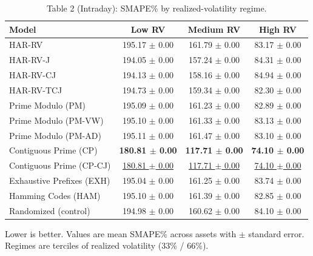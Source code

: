 \begin{table}[t]
\centering
\caption{Table 2 (Intraday): SMAPE\% by realized-volatility regime.}
\label{tab:regimes_intraday}
\begin{tabular}{lccc}
\toprule
Model & Low RV & Medium RV & High RV \\
\midrule
 HAR-RV & 195.17 $\pm$ 0.00 & 161.79 $\pm$ 0.00 & 83.17 $\pm$ 0.00 \\
 HAR-RV-J & 194.05 $\pm$ 0.00 & 157.24 $\pm$ 0.00 & 84.31 $\pm$ 0.00 \\
 HAR-RV-CJ & 194.13 $\pm$ 0.00 & 158.16 $\pm$ 0.00 & 84.94 $\pm$ 0.00 \\
 HAR-RV-TCJ & 194.73 $\pm$ 0.00 & 159.34 $\pm$ 0.00 & 82.30 $\pm$ 0.00 \\
 Prime Modulo (PM) & 195.09 $\pm$ 0.00 & 161.23 $\pm$ 0.00 & 82.89 $\pm$ 0.00 \\
 Prime Modulo (PM-VW) & 195.10 $\pm$ 0.00 & 161.33 $\pm$ 0.00 & 83.13 $\pm$ 0.00 \\
 Prime Modulo (PM-AD) & 195.11 $\pm$ 0.00 & 161.47 $\pm$ 0.00 & 83.10 $\pm$ 0.00 \\
 Contiguous Prime (CP) & \textbf{180.81 $\pm$ 0.00} & \textbf{117.71 $\pm$ 0.00} & \textbf{74.10 $\pm$ 0.00} \\
 Contiguous Prime (CP-CJ) & \underline{180.81 $\pm$ 0.00} & \underline{117.71 $\pm$ 0.00} & \underline{74.10 $\pm$ 0.00} \\
 Exhaustive Prefixes (EXH) & 195.04 $\pm$ 0.00 & 161.25 $\pm$ 0.00 & 83.74 $\pm$ 0.00 \\
 Hamming Codes (HAM) & 195.10 $\pm$ 0.00 & 161.39 $\pm$ 0.00 & 82.85 $\pm$ 0.00 \\
 Randomized (control) & 194.98 $\pm$ 0.00 & 160.62 $\pm$ 0.00 & 84.10 $\pm$ 0.00 \\
\bottomrule
\end{tabular}
\vspace{2pt}\par\footnotesize Lower is better. Values are mean SMAPE\% across assets with $\pm$ standard error. Regimes are terciles of realized volatility (33\% / 66\%).
\end{table}